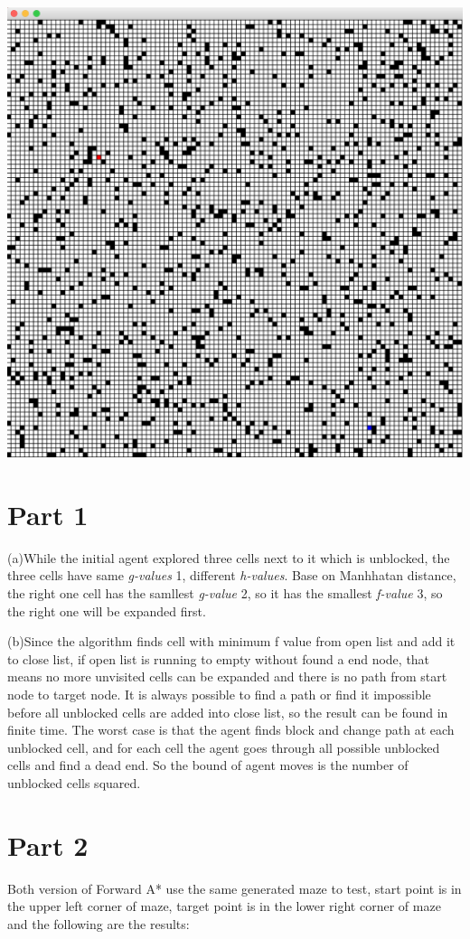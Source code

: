 \documentclass[12pt]{amsart}
\begin{document}
\includegraphics[width=1\linewidth]{maze}

\section*{Part 1}
(a)While the initial agent explored three cells next to it which is unblocked, the three cells have same \emph{g-values} 1, different \emph{h-values}. Base on Manhhatan distance, the right one cell has the samllest \emph{g-value} 2, so it has the smallest \emph{f-value} 3, so the right one will be expanded first.

(b)Since the algorithm finds cell with minimum f value from open list and add it to close list, if open list is running to empty without found a end node, that means no more unvisited cells can be expanded and there is no path from start node to target node. It is always possible to find a path or find it impossible before all unblocked cells are added into close list, so the result can be found in finite time. The worst case is that the agent finds block and change path at each unblocked cell, and for each cell the agent goes through all possible unblocked cells and find a dead end. So the bound of agent moves is the number of unblocked cells squared.

\newpage
\section*{Part 2}
Both version of Forward A* use the same generated maze to test, start point is in the upper left corner of maze, target point is in the lower right corner of maze and the following are the results:
\end{document}
